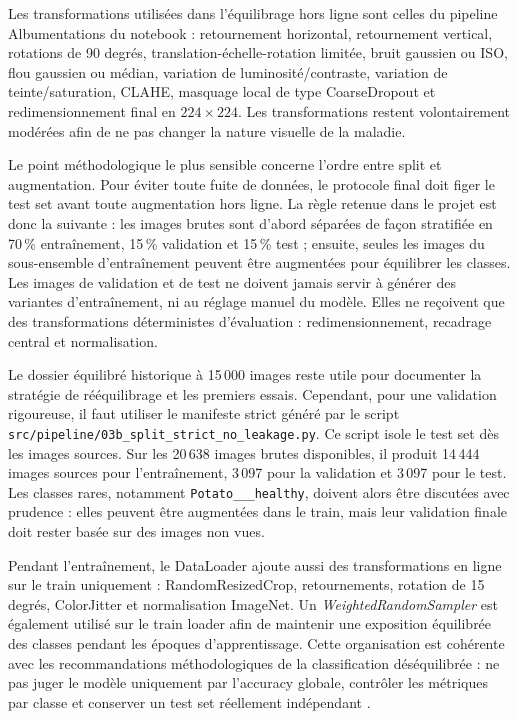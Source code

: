 ﻿\documentclass[11pt,a4paper,openany]{report}
\begin{document}
Les transformations utilisées dans l'équilibrage hors ligne sont celles du pipeline Albumentations du notebook : retournement horizontal, retournement vertical, rotations de 90 degrés, translation-échelle-rotation limitée, bruit gaussien ou ISO, flou gaussien ou médian, variation de luminosité/contraste, variation de teinte/saturation, CLAHE, masquage local de type CoarseDropout et redimensionnement final en \(224 \times 224\). Les transformations restent volontairement modérées afin de ne pas changer la nature visuelle de la maladie.

Le point méthodologique le plus sensible concerne l'ordre entre split et augmentation. Pour éviter toute fuite de données, le protocole final doit figer le test set avant toute augmentation hors ligne. La règle retenue dans le projet est donc la suivante : les images brutes sont d'abord séparées de façon stratifiée en 70\,\% entraînement, 15\,\% validation et 15\,\% test ; ensuite, seules les images du sous-ensemble d'entraînement peuvent être augmentées pour équilibrer les classes. Les images de validation et de test ne doivent jamais servir à générer des variantes d'entraînement, ni au réglage manuel du modèle. Elles ne reçoivent que des transformations déterministes d'évaluation : redimensionnement, recadrage central et normalisation.

Le dossier équilibré historique à 15\,000 images reste utile pour documenter la stratégie de rééquilibrage et les premiers essais. Cependant, pour une validation rigoureuse, il faut utiliser le manifeste strict généré par le script \texttt{src/pipeline/03b\_split\_strict\_no\_leakage.py}. Ce script isole le test set dès les images sources. Sur les 20\,638 images brutes disponibles, il produit 14\,444 images sources pour l'entraînement, 3\,097 pour la validation et 3\,097 pour le test. Les classes rares, notamment \texttt{Potato\_\_\_healthy}, doivent alors être discutées avec prudence : elles peuvent être augmentées dans le train, mais leur validation finale doit rester basée sur des images non vues.

Pendant l'entraînement, le DataLoader ajoute aussi des transformations en ligne sur le train uniquement : RandomResizedCrop, retournements, rotation de 15 degrés, ColorJitter et normalisation ImageNet. Un \textit{WeightedRandomSampler} est également utilisé sur le train loader afin de maintenir une exposition équilibrée des classes pendant les époques d'apprentissage. Cette organisation est cohérente avec les recommandations méthodologiques de la classification déséquilibrée : ne pas juger le modèle uniquement par l'accuracy globale, contrôler les métriques par classe et conserver un test set réellement indépendant \cite{brownleeimbalanced}.
\end{document}
